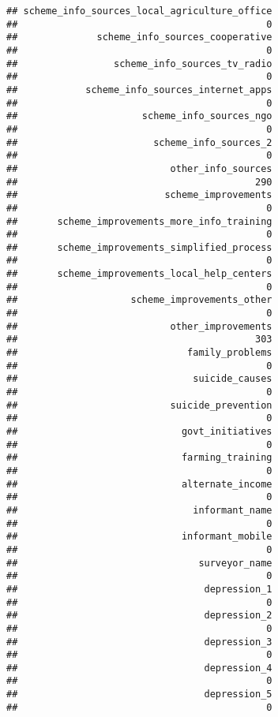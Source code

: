 \documentclass[
]{article}
\begin{document}
\begin{verbatim}
## scheme_info_sources_local_agriculture_office 
##                                            0 
##              scheme_info_sources_cooperative 
##                                            0 
##                 scheme_info_sources_tv_radio 
##                                            0 
##            scheme_info_sources_internet_apps 
##                                            0 
##                      scheme_info_sources_ngo 
##                                            0 
##                        scheme_info_sources_2 
##                                            0 
##                           other_info_sources 
##                                          290 
##                          scheme_improvements 
##                                            0 
##       scheme_improvements_more_info_training 
##                                            0 
##       scheme_improvements_simplified_process 
##                                            0 
##       scheme_improvements_local_help_centers 
##                                            0 
##                    scheme_improvements_other 
##                                            0 
##                           other_improvements 
##                                          303 
##                              family_problems 
##                                            0 
##                               suicide_causes 
##                                            0 
##                           suicide_prevention 
##                                            0 
##                             govt_initiatives 
##                                            0 
##                             farming_training 
##                                            0 
##                             alternate_income 
##                                            0 
##                               informant_name 
##                                            0 
##                             informant_mobile 
##                                            0 
##                                surveyor_name 
##                                            0 
##                                 depression_1 
##                                            0 
##                                 depression_2 
##                                            0 
##                                 depression_3 
##                                            0 
##                                 depression_4 
##                                            0 
##                                 depression_5 
##                                            0 

\end{verbatim}
\end{document}
